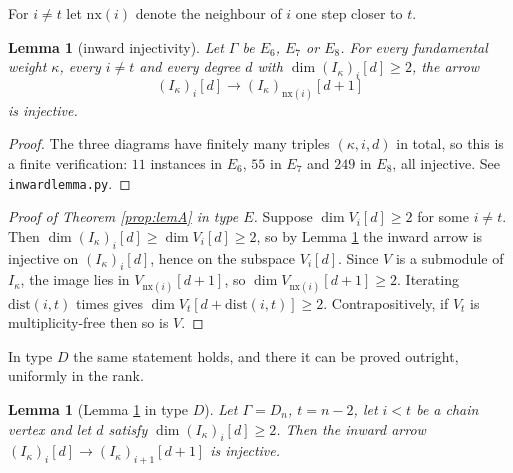 \documentclass[11pt,reqno]{amsart}
\theoremstyle{plain}
\newtheorem{lemma}[theorem]{Lemma}
\theoremstyle{definition}
\newcommand{\ka}{\kappa}
\begin{document}
For $i\ne t$ let $\mathrm{nx}(i)$ denote the neighbour of $i$ one step closer
to $t$.

\begin{lemma}[inward injectivity]\label{lem:I}
Let $\Gamma$ be $E_6$, $E_7$ or $E_8$.  For every fundamental weight $\ka$,
every $i\ne t$ and every degree $d$ with $\dim (I_\ka)_i[d]\ge2$, the arrow
\[
   (I_\ka)_i[d]\longrightarrow (I_\ka)_{\mathrm{nx}(i)}[d+1]
\]
is injective.
\end{lemma}

\begin{proof}
The three diagrams have finitely many triples $(\ka,i,d)$ in total, so this is
a finite verification: $11$ instances in $E_6$, $55$ in $E_7$ and $249$ in
$E_8$, all injective.  See \texttt{inwardlemma.py}.
\end{proof}

\begin{proof}[Proof of Theorem \ref{prop:lemA} in type $E$]
Suppose $\dim V_i[d]\ge2$ for some $i\ne t$.  Then
$\dim (I_\ka)_i[d]\ge \dim V_i[d]\ge2$, so by Lemma \ref{lem:I} the inward
arrow is injective on $(I_\ka)_i[d]$, hence on the subspace $V_i[d]$.  Since
$V$ is a submodule of $I_\ka$, the image lies in $V_{\mathrm{nx}(i)}[d+1]$, so
$\dim V_{\mathrm{nx}(i)}[d+1]\ge2$.  Iterating $\mathrm{dist}(i,t)$ times gives
$\dim V_t[d+\mathrm{dist}(i,t)]\ge2$.  Contrapositively, if $V_t$ is
multiplicity-free then so is $V$.
\end{proof}

In type $D$ the same statement holds, and there it can be proved outright,
uniformly in the rank.

\begin{lemma}[Lemma \ref{lem:I} in type $D$]\label{lem:Id}
Let $\Gamma=D_n$, $t=n-2$, let $i<t$ be a chain vertex and let $d$ satisfy
$\dim (I_\ka)_i[d]\ge2$.  Then the inward arrow
$(I_\ka)_i[d]\to(I_\ka)_{i+1}[d+1]$ is injective.
\end{lemma}
\end{document}
